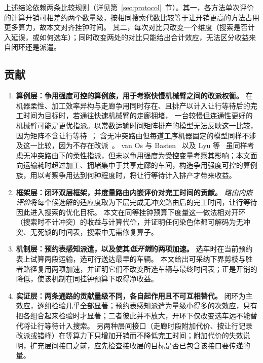 \documentclass[manuscript,screen,review]{acmart}
\begin{document}
上述结论依赖两条比较规则（详见第~\ref{sec:protocol}~节）。其一，各方法单次评价的计算开销可相差约两个数量级，按相同搜索代数比较等于让开销更高的方法占用更多算力，故本文对齐挂钟时间。
其二，每次对比只改变一个维度（搜索是否计入延误，或如何选车）；同时改变两处的对比只能给出合计效应，无法区分收益来自闭环还是派遣。

\subsection{贡献}

\begin{enumerate}[leftmargin=*]

\item \textbf{算例层：争用强度可控的算例族，用于考察快慢机械臂之间的改派权衡。} 在机器柔性、加工效率异构与走廊争用同时存在、且排产以计入让行等待后的完工时间为目标时，若通往快速机械臂的走廊拥堵，
一台较慢但连通性更好的机械臂可能是更优指派。以常数运输时间矩阵排产的模型无法反映这一比较，因为矩阵不含让行等待~\cite{sun2023integrated}；
含无冲突路由但每道工序机器固定的模型同样不涉及这一比较，因为不存在改派~\cite{li2026framework}。
van Os 与 Basten~\cite{vanos2026exact} 以及 Lyu 等~\cite{lyu2019approach} 虽同样考虑无冲突路由下的柔性指派，但未以争用强度为受控变量考察其影响；本文面向运输耗时超过加工、拥堵集中于共享走廊的车间，构造争用强度可控的算例族，用以考察争用达到何种程度时，将让行等待计入排产才带来收益。

\item \textbf{框架层：闭环双层框架，并度量路由内嵌评价对完工时间的贡献。} \emph{路由内嵌评价}将每个候选解的适应度取为下层完成无冲突路由后的完工时间，让行等待因此进入搜索的优化目标。
本文在同等挂钟预算下度量这一做法相对开环（搜索时不计冲突）的收益与计算代价，并证明任何染色体都可解码为无冲突、无死锁的时间表，搜索中无需修复算子。

\item \textbf{机制层：预约表感知派遣，以及使其\emph{低开销}的两项加速。} 选车时在当前预约表上试算两段运输，选可行送达最早的车辆。
本文给出可采纳下界剪枝与胜者路径复用两项加速，并证明它们不改变所选车辆与最终时间表；正是开销的降低，使该机制在同挂钟预算下取得净收益。

\item \textbf{实证层：两条通路的贡献量级不同，各自起作用且不可互相替代。} 闭环为主效应，逐组检验几乎全部显著；预约表感知派遣为量级小得多的次效应，只有把各组合起来检验时才显著；二者彼此并不放大，开环下仅改变选车远不能替代将让行等待计入搜索。
另两种层间接口（走廊时段附加代价、按让行记录改派或错峰）在等算力下只增加开销而不降低完工时间；附加代价的失效说明，扩充层间接口之前，应先检查接收层的目标是否已包含该接口要传递的量。


\end{enumerate}
\end{document}
